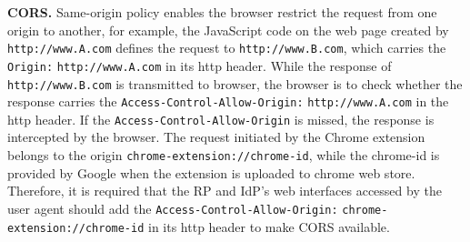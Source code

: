 \noindent\textbf{CORS.} Same-origin policy enables the browser restrict the request from one origin to another, for example, the JavaScript code on the web page created by \verb+http://www.A.com+ defines the request to \verb+http://www.B.com+, which carries the \verb+Origin:+ \verb+http://www.A.com+ in its http header. While the response of \verb+http://www.B.com+ is transmitted to browser, the browser is to check whether the response carries the \verb+Access-Control-Allow-Origin:+ \verb+http://www.A.com+ in the http header. If the \verb+Access-Control-Allow-Origin+ is missed, the response is intercepted by the browser. The request initiated by the Chrome extension belongs to the origin \verb+chrome-extension://chrome-id+, while the chrome-id is provided by Google when the extension is uploaded to chrome web store. Therefore, it is required that the RP and IdP's web interfaces accessed by the user agent should add the  \verb+Access-Control-Allow-Origin:+ \verb+chrome-extension://chrome-id+ in its http header to make CORS available.



